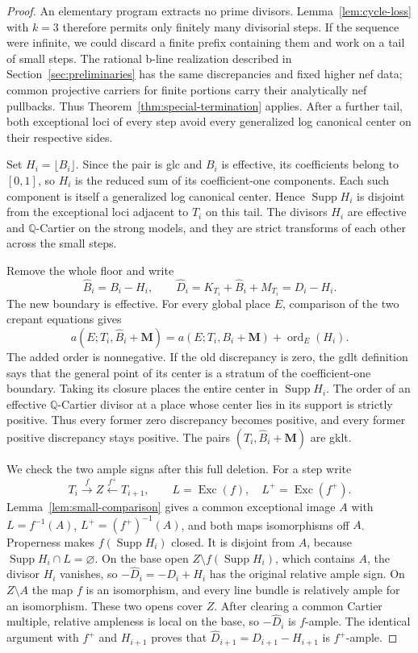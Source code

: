 \documentclass[11pt]{amsart}
\theoremstyle{definition}
\theoremstyle{remark}
\numberwithin{equation}{section}
\newcommand{\Q}{\mathbb{Q}}
\newcommand{\M}{\mathbf{M}}
\DeclareMathOperator{\Exc}{Exc}
\DeclareMathOperator{\Supp}{Supp}
\DeclareMathOperator{\ord}{ord}
\begin{document}
\begin{proof}
An elementary program extracts no prime divisors.  Lemma~\ref{lem:cycle-loss} with \(k=3\)
therefore permits only finitely many divisorial steps.  If the sequence were
infinite, we could discard a finite prefix containing them and work on a
tail of small steps.
The rational b-line realization described in
Section~\ref{sec:preliminaries} has the same discrepancies and fixed higher
nef data; common projective carriers for finite portions carry their
analytically nef pullbacks.  Thus Theorem~\ref{thm:special-termination}
applies.  After a further tail, both exceptional loci of every step avoid
every generalized log canonical center on their respective sides.

Set \(H_i=\lfloor B_i\rfloor\).  Since the pair is glc and \(B_i\) is
effective, its coefficients belong to \([0,1]\), so \(H_i\) is the reduced
sum of its coefficient-one components.  Each such component is itself a
generalized log canonical center.  Hence \(\Supp H_i\) is disjoint from
the exceptional loci adjacent to \(T_i\) on this tail.  The divisors
\(H_i\) are effective and \(\Q\)-Cartier on the strong models, and they
are strict transforms of each other across the small steps.

Remove the whole floor and write
\[
 \widehat B_i=B_i-H_i,
 \qquad \widehat D_i=K_{T_i}+\widehat B_i+M_{T_i}=D_i-H_i.
\]
The new boundary is effective.  For every global place \(E\), comparison
of the two crepant equations gives
\begin{equation}\label{eq:full-floor-deletion}
 a(E;T_i,\widehat B_i+\M)
 =a(E;T_i,B_i+\M)+\ord_E(H_i).
\end{equation}
The added order is nonnegative.  If the old discrepancy is zero, the gdlt
definition says that the general point of its center is a stratum of the
coefficient-one boundary.  Taking its closure places the entire center in
\(\Supp H_i\).  The order of an effective \(\Q\)-Cartier divisor at a
place whose center lies in its support is strictly positive.  Thus every
former zero discrepancy becomes positive, and every former positive
discrepancy stays positive.  The pairs \((T_i,\widehat B_i+\M)\) are gklt.

We check the two ample signs after this full deletion.  For a step write
\[
 T_i\xrightarrow{f}Z\xleftarrow{f^+}T_{i+1},
 \qquad L=\Exc(f),\quad L^+=\Exc(f^+).
\]
Lemma~\ref{lem:small-comparison} gives a common exceptional image \(A\)
with \(L=f^{-1}(A)\), \(L^+=(f^+)^{-1}(A)\), and both maps isomorphisms
off \(A\).  Properness makes \(f(\Supp H_i)\) closed.  It is disjoint from
\(A\), because \(\Supp H_i\cap L=\varnothing\).  On the base open
\(Z\setminus f(\Supp H_i)\), which contains \(A\), the divisor \(H_i\)
vanishes, so \(-\widehat D_i=-D_i+H_i\) has the original relative ample
sign.  On \(Z\setminus A\) the map \(f\) is an isomorphism, and every line
bundle is relatively ample for an isomorphism.  These two opens cover
\(Z\).  After clearing a common Cartier multiple, relative ampleness is
local on the base, so \(-\widehat D_i\) is \(f\)-ample.  The identical
argument with \(f^+\) and \(H_{i+1}\) proves that
\(\widehat D_{i+1}=D_{i+1}-H_{i+1}\) is \(f^+\)-ample.


\end{proof}
\end{document}
